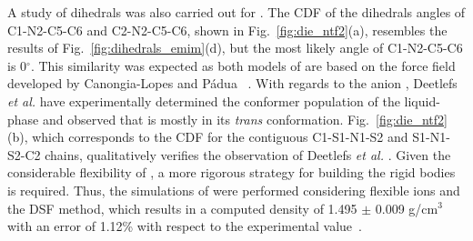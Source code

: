 \documentclass[3p,twocolumn]{elsarticle}
\begin{document}
A study of dihedrals was also carried out for \ce{[emim][NTf_2]}.
The CDF of the dihedrals angles of C1-N2-C5-C6 and C2-N2-C5-C6, shown in Fig.~\ref{fig:die_ntf2}(a), resembles the results of Fig.~\ref{fig:dihedrals_emim}(d), but the most likely angle of C1-N2-C5-C6 is 0$^{\circ}$.
This similarity was expected as both models of \ce{[emim]^+} are based on the force field developed by Canongia-Lopes and P\'{a}dua~ \cite{Canongia_Lopes_2006}.
With regards to the anion \ce{[NTf_2]^-}, Deetlefs \textit{et al.} \cite{Deetlefs_2006} have experimentally determined the conformer population of the liquid-phase and observed that \ce{[NTf_2]^-} is mostly in its \textit{trans} conformation.
Fig.~\ref{fig:die_ntf2}(b), which corresponds to the CDF for the contiguous C1-S1-N1-S2 and S1-N1-S2-C2 chains, qualitatively verifies the observation of Deetlefs \textit{et al.} \cite{Deetlefs_2006}.
Given the considerable flexibility of \ce{[NTf_2]^-}, a more rigorous strategy for building the rigid bodies is required.
Thus, the simulations of \ce{[emim][NTf_2]} were performed considering flexible ions and the DSF method, which results in a computed density of 1.495 $\pm$ 0.009 g/cm$^3$ with an error of 1.12\% with respect to the experimental value~\cite{Tokuda_2005}.
\end{document}
